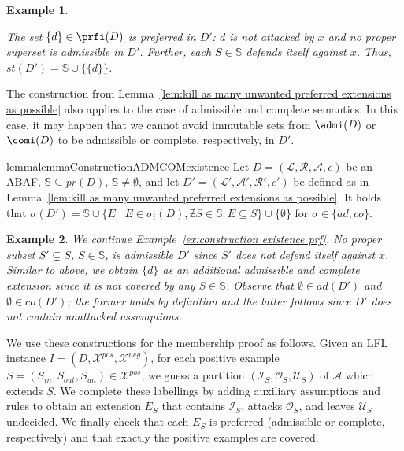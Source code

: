 \documentclass[letterpaper]{article} %
\newcommand{\adm}{\textit{ad}}
\newcommand{\com}{\textit{co}}
\newcommand{\stb}{\textit{st}}
\newcommand{\prf}{\textit{pr}}
\newcommand{\lit}{\ensuremath{\mathcal{L}}}
\newcommand{\rules}{\ensuremath{\mathcal{R}}}
\newcommand{\asm}{\ensuremath{\mathcal{A}}}
\newcommand{\atoms}{\mathcal{L}}
\newcommand{\ruleset}{\mathcal{R}}
\newcommand{\assumptions}{\mathcal{A}}
\newcommand{\contra}{c}
\newcommand{\contraryempty}{c}
\newcommand{\ABAdef}{D=(\atoms,\ruleset,\assumptions,\contra)}
\newcommand{\setS}{\mathbb{S}}
\newcommand{\Xpos}{\mathcal{X}^{pos}}
\newcommand{\Xneg}{\mathcal{X}^{neg}}
\newtheorem{example}{Example}[section]
\begin{document}
\begin{example}
\begin{center}
    \end{center}
    The set $\{d\}\in \prfi(D)$ is preferred in $D'$: $d$ is not attacked by $x$ and no proper superset is admissible in $D'$.
    Further, each $S\in \setS$ defends itself against $x$.
    Thus, $\stb(D')=\setS\cup \{\{d\}\}$.
\end{example}


The construction from Lemma~\ref{lem:kill as many unwanted preferred extensions as possible} also applies to the case of admissible and complete semantics. In this case, it may happen that we cannot avoid immutable sets from $\admi(D)$ or $\comi(D)$ to be admissible or complete, respectively, in $D'$.%
\begin{restatable}{lemma}{lemmaConstructionADMCOMexistence}\label{lem:control admissible and complete extensions}
    Let $\ABAdef$ be an ABAF, $\setS\subseteq \prf(D)$, $\setS\neq \emptyset$, and let $D'=(\lit',\asm',\rules',\contraryempty')$ be defined as in Lemma~\ref{lem:kill as many unwanted preferred extensions as possible}. 
    It holds that $\sigma(D')=\setS\cup 
    \{ E \mid E\in \sigma_i(D),\nexists S\in \setS: E\subseteq S\}\cup \{\emptyset\}$ for $\sigma\in \{\adm,\com\}$.
\end{restatable}
\begin{example}
    We continue Example~\ref{ex:construction existence prf}. 
    No proper subset $S'\subsetneq S$, $S\in \setS$, is admissible $D'$ since $S'$ does not defend itself against $x$. Similar to above, we obtain $\{d\}$ as an additional admissible and complete extension since it is not covered by any $S\in \setS$. Observe that $\emptyset\in \adm(D')$ and $\emptyset\in \com(D')$; the former holds by definition and the latter follows since $D'$ does not contain unattacked assumptions.
\end{example}
We use these constructions for the membership proof as follows. Given an LFL instance $I=(D,\Xpos,\Xneg)$, for each positive example $S=(S_{in},S_{out},S_{un})\in\Xpos$, we guess a partition $(\mathcal{I}_S,\mathcal{O}_S,\mathcal{U}_S)$  of $\asm$ which extends $S$. We complete these labellings by adding auxiliary assumptions and rules to obtain an extension $E_S$ that contains $\mathcal{I}_S$, attacks $\mathcal{O}_S$, and leaves $\mathcal{U}_S$ undecided. We finally check that each $E_S$ is preferred (admissible or complete, respectively) and that exactly the positive examples are covered.
\end{document}

